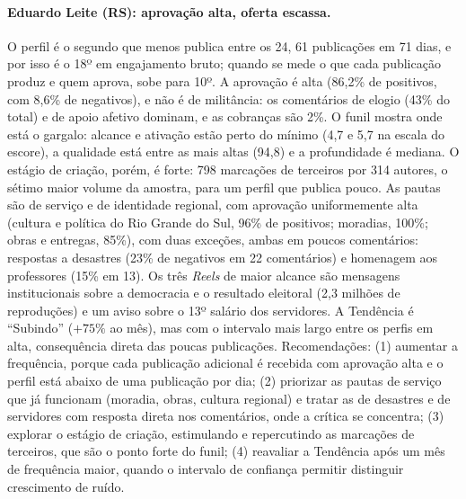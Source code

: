 \paragraph*{Eduardo Leite (RS): aprovação alta, oferta escassa.} O perfil é o segundo que menos publica entre os 24, 61 publicações em 71 dias, e por isso é o 18º em engajamento bruto; quando se mede o que cada publicação produz e quem aprova, sobe para 10º. A aprovação é alta (86,2\% de positivos, com 8,6\% de negativos), e não é de militância: os comentários de elogio (43\% do total) e de apoio afetivo dominam, e as cobranças são 2\%. O funil mostra onde está o gargalo: alcance e ativação estão perto do mínimo (4,7 e 5,7 na escala do escore), a qualidade está entre as mais altas (94,8) e a profundidade é mediana. O estágio de criação, porém, é forte: 798 marcações de terceiros por 314 autores, o sétimo maior volume da amostra, para um perfil que publica pouco. As pautas são de serviço e de identidade regional, com aprovação uniformemente alta (cultura e política do Rio Grande do Sul, 96\% de positivos; moradias, 100\%; obras e entregas, 85\%), com duas exceções, ambas em poucos comentários: respostas a desastres (23\% de negativos em 22 comentários) e homenagem aos professores (15\% em 13). Os três \emph{Reels} de maior alcance são mensagens institucionais sobre a democracia e o resultado eleitoral (2,3 milhões de reproduções) e um aviso sobre o 13º salário dos servidores. A Tendência é ``Subindo'' ($+75\%$ ao mês), mas com o intervalo mais largo entre os perfis em alta, consequência direta das poucas publicações. Recomendações: (1) aumentar a frequência, porque cada publicação adicional é recebida com aprovação alta e o perfil está abaixo de uma publicação por dia; (2) priorizar as pautas de serviço que já funcionam (moradia, obras, cultura regional) e tratar as de desastres e de servidores com resposta direta nos comentários, onde a crítica se concentra; (3) explorar o estágio de criação, estimulando e repercutindo as marcações de terceiros, que são o ponto forte do funil; (4) reavaliar a Tendência após um mês de frequência maior, quando o intervalo de confiança permitir distinguir crescimento de ruído.

